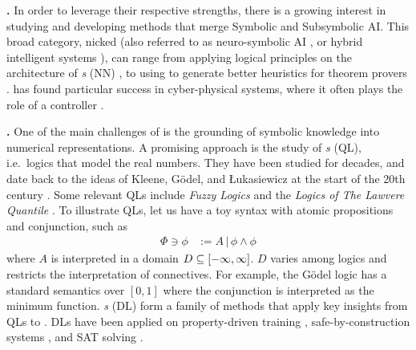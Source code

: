 \textbf{\InAI{}.} In order to leverage their respective strengths, there is a growing interest in studying and developing methods that merge Symbolic and Subsymbolic AI. This broad category, nicked \emph{\InAI{}}  \citep{Platzer_2024} (also referred to as neuro-symbolic AI \citep{d2009neural}, or hybrid intelligent systems \citep{medsker2012hybrid}), can range from applying logical principles on the architecture of \emph{ \NN{}s} (NN)  \citep{badreddine2022logic, petersen2022deep}, to using \SuAI{} to generate better heuristics for theorem provers \citep{laurent2022learning}. \InAI{} has found particular success in cyber-physical systems, where it often plays the role of a controller \citep{Platzer_2024}.

\textbf{\DL{}.} One of the main challenges of \InAI{} is the grounding of symbolic knowledge into numerical representations. A promising approach is the study of \emph{\QL{}s} (QL), i.e.~logics that model the real numbers. They have been studied for decades, and date back to the ideas of Kleene, G\"{o}del, and Łukasiewicz at the start of the 20th century \citep{cintula2011handbook, prooffuzzy}. Some relevant QLs include \emph{Fuzzy Logics} \citep{cintula2011handbook} and the \emph{Logics of The Lawvere Quantile} \citep{bacci2024polynomial, bacci2023propositional, capucci2024quantifiers, bacci2025induction}. To illustrate QLs, let us have a toy syntax with atomic propositions and conjunction, such as
\begin{equation}
\begin{split}
    \Phi \ni \phi &:= A \,|\, \phi \land \phi
\end{split}
\end{equation}
where $A$ is interpreted in a domain $D \subseteq [-\infty,\infty]$. $D$ varies among logics and restricts the interpretation of connectives. For example, the
G\"{o}del logic \citep{BAAZ200723} has a standard semantics over $[0, 1]$ where the conjunction is interpreted as the minimum function. \emph{\DL{}s} (DL) form a family of methods that apply key insights from QLs to \InAI{}. DLs have been applied on property-driven training \citep{FLINKOW2025103280}, safe-by-construction systems \citep{badreddine2022logic}, and SAT solving \citep{kyrillidis2021continuous, gaglione2022maxsat}. 

